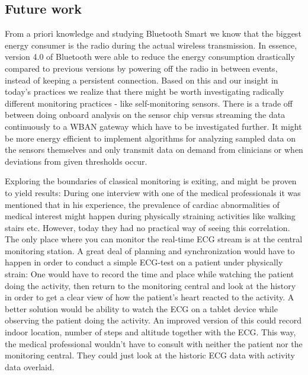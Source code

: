 

\subsection{Future work} %
\label{sub:future_work}


From a priori knowledge and studying Bluetooth Smart we know that the biggest energy consumer is the radio during the actual wireless transmission. In essence, version 4.0 of Bluetooth were able to reduce the energy consumption drastically compared to previous versions by powering off the radio in between events, instead of keeping a persistent connection. Based on this and our insight in today's practices we realize that there might be worth investigating radically different monitoring practices - like self-monitoring sensors. There is a trade off between doing onboard analysis on the sensor chip versus streaming the data continuously to a WBAN gateway which have to be investigated further. It might be more energy efficient to implement algorithms for analyzing sampled data on the sensors themselves and only transmit data on demand from clinicians or when deviations from given thresholds occur.

Exploring the boundaries of classical monitoring is exiting, and might be proven to yield results: During one interview with one of the medical professionals it was mentioned that in his experience, the prevalence of cardiac abnormalities of medical interest might happen during physically straining activities like walking stairs etc. However, today they had no practical way of seeing this correlation. The only place where you can monitor the real-time ECG stream is at the central monitoring station. A great deal of planning and synchronization would have to happen in order to conduct a simple ECG-test on a patient under physically strain: One would have to record the time and place while watching the patient doing the activity, then return to the monitoring central and look at the history in order to get a clear view of how the patient's heart reacted to the activity. A better solution would be ability to watch the ECG on a tablet device while observing the patient doing the activity. An improved version of this could record indoor location, number of steps and altitude together with the ECG. This way, the medical professional wouldn't have to consult with neither the patient nor the monitoring central. They could just look at the historic ECG data with activity data overlaid.

